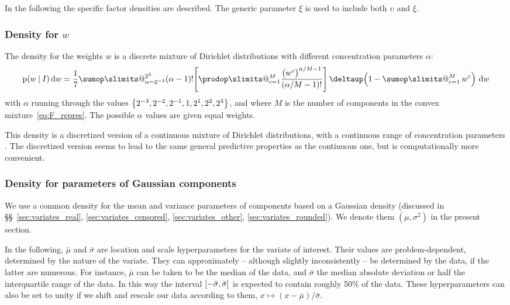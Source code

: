 \documentclass[a4paper,12pt,%
onecolumn,oneside,article,%
british%
]{memoir}
\makeatletter
\def\sum{\DOTSI\sumop\slimits@}
\def\prod{\DOTSI\prodop\slimits@}
\newcommand*{\delt}{\deltaup}%
\newcommand*{\di}{\mathop{}\!\mathrm{d}}%
\DeclarePairedDelimiter\clcl{[}{]}
\DeclarePairedDelimiter\set{\{}{\}} %
\newcommand*{\p}{\mathrm{p}}%
\renewcommand*{\|}[1][]{\nonscript\:#1\vert\nonscript\:\mathopen{}}
\newcommand*{\sect}{\S}%
\newcommand*{\sects}{\S\S}%
\newcommand*{\eg}{{e.g.}}
\newcommand*{\tsum}{\mathop{\textstyle\sum}\nolimits}
\newcommand*{\muo}{\bar{\mu}}
\newcommand*{\sigmao}{\bar{\sigma}}
\makeatother
\begin{document}
In the following the specific factor densities are described. The generic parameter $\xi$ is used to include both $\upsilon$ and $\xi$.

\subsubsection{Density for $w$}
\label{sec:params_w}

The density for the weights $w$ is a discrete mixture of Dirichlet distributions with different concentration parameters $\alpha$:
\begin{equation}
  \label{eq:density_w}
  \p(w\|I)\di w =
  \frac{1}{7}
  \sum_{\alpha=2^{-3}}^{2^{3}}
  (\alpha - 1)! \Biggl[\prod_{c=1}^{M}
  \frac{\bigl(w^{c}\bigr)^{\alpha/M-1}}{(\alpha/M -1)!} \Biggr]
  \, \delt\Bigl(1-\tsum_{c=1}^{M} w^{c}\Bigr)\,
  \di w
\end{equation}
with $\alpha$ running through the values $\set*{2^{-3},2^{-2},2^{-1},1,2^{1},2^{2},2^{3}}$, and where $M$ is the number of components in the convex mixture~\eqref{eq:F_repres}. The possible $\alpha$ values are given equal weights.

This density is a discretized version of a continuous mixture of Dirichlet distributions, with a continuous range of concentration parameters \autocites[\eg][\sect\,2.5]{rossi2014}[\sect\,2.1]{rasmussen1999}. The discretized version seems to lead to the same general predictive properties as the continuous one, but is computationally more convenient.


\subsubsection{Density for parameters of Gaussian components}
\label{sec:params_gaussian}

We use a common density for the mean and variance parameters of components based on a Gaussian density (discussed in \sects~\ref{sec:variates_real}, \ref{sec:variates_censored}, \ref{sec:variates_other}, \ref{sec:variates_rounded}). We denote them $(\mu, \sigma^{2})$ in the present section.

In the following, $\muo$ and $\sigmao$ are location and scale hyperparameters for the variate of interest. Their values are problem-dependent, determined by the nature of the variate. They can approximately -- although slightly inconsistently -- be determined by the data, if the latter are numerous. For instance, $\muo$ can be taken to be the median of the data, and $\sigmao$ the median absolute deviation or half the interquartile range of the data. In this way the interval $\clcl{-\sigmao, \sigmao}$ is expected to contain roughly 50\% of the data.%
These hyperparameters can also be set to unity if we shift and rescale our data according to them, $x \mapsto (x-\muo)/\sigmao$.
\end{document}
